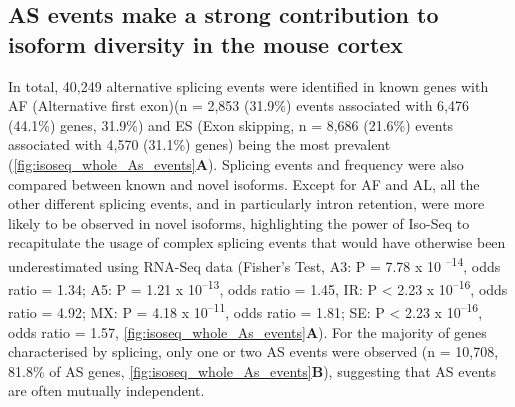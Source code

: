 \subsection{AS events make a strong contribution to isoform diversity in the mouse cortex}
\label{ch4_AS}
In total, 40,249 alternative splicing events were identified in known genes with AF (Alternative first exon)(n = 2,853 (31.9\%) events associated with 6,476 (44.1\%) genes, 31.9\%) and ES (Exon skipping, n = 8,686 (21.6\%) events associated with 4,570 (31.1\%) genes) being the most prevalent (\cref{fig:isoseq_whole_As_events}\textbf{A}). Splicing events and frequency were also compared between known and novel isoforms. Except for AF and AL, all the other different splicing events, and in particularly intron retention, were more likely to be observed in novel isoforms, highlighting the power of Iso-Seq to recapitulate the usage of complex splicing events that would have otherwise been underestimated using RNA-Seq data (Fisher's Test, A3: P = 7.78 x 10 \textsuperscript{–14}, odds ratio = 1.34; A5: P = 1.21 x 10\textsuperscript{–13}, odds ratio = 1.45, IR: P < 2.23 x 10\textsuperscript{–16}, odds ratio = 4.92; MX: P = 4.18 x 10\textsuperscript{–11}, odds ratio = 1.81; SE: P < 2.23 x 10\textsuperscript{–16}, odds ratio = 1.57, \cref{fig:isoseq_whole_As_events}\textbf{A}). For the majority of genes characterised by splicing, only one or two AS events were observed (n = 10,708, 81.8\% of AS genes, \cref{fig:isoseq_whole_As_events}\textbf{B}), suggesting that AS events are often mutually independent. 

